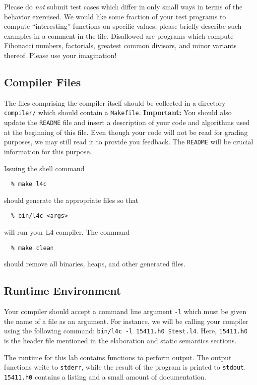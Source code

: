 \documentclass[11pt]{article}
\begin{document}
Please do \emph{not} submit test cases which differ in only small ways
in terms of the behavior exercised. We would like some fraction of
your test programs to compute ``interesting'' functions on specific
values; please briefly describe such examples in a comment in the
file. Disallowed are programs which compute Fibonacci numbers,
factorials, greatest common divisors, and minor variants
thereof. Please use your imagination!

\subsection*{Compiler Files}

The files comprising the compiler itself should be collected in a
directory \verb"compiler/" which should contain a \verb"Makefile".
\textbf{Important:} You should also update the \verb"README" file and
insert a description of your code and algorithms used at the beginning
of this file.  Even though your code will not be read for grading
purposes, we may still read it to provide you feedback.  The
\verb"README" will be crucial information for this purpose.

Issuing the shell command
\begin{verbatim}
  % make l4c
\end{verbatim}
should generate the appropriate files so that
\begin{verbatim}
  % bin/l4c <args>
\end{verbatim}
will run your L4 compiler.  The command
\begin{verbatim}
  % make clean
\end{verbatim}
should remove all binaries, heaps, and other generated files.

\subsection*{Runtime Environment}

Your compiler should accept a command line argument \texttt{-l} which
must be given the name of a file as an argument. For instance, we will
be calling your compiler using the following command: \texttt{bin/l4c
  -l 15411.h0 \$test.l4}. Here, \texttt{15411.h0} is the header file
mentioned in the elaboration and static semantics sections.

The runtime for this lab contains functions to perform output. The
output functions write to \texttt{stderr}, while the result of the
program is printed to \texttt{stdout}. \texttt{15411.h0} contains a
listing and a small amount of documentation.
\end{document}

